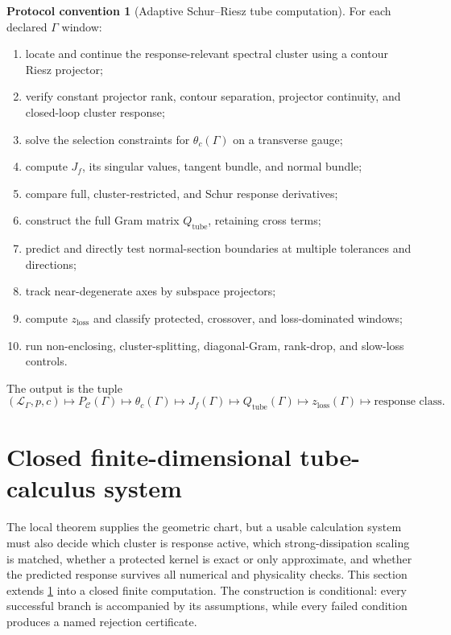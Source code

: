 \documentclass[11pt]{article}
\theoremstyle{definition}
\newtheorem{protocol}[theorem]{Protocol convention}
\theoremstyle{remark}
\newcommand{\cL}{\mathcal L}
\newcommand{\cC}{\mathcal C}
\begin{document}
\begin{protocol}[Adaptive Schur--Riesz tube computation]\label{prot:tube-computation}
For each declared $\Gamma$ window:
\begin{enumerate}
  \item locate and continue the response-relevant spectral cluster using a contour Riesz projector;
  \item verify constant projector rank, contour separation, projector continuity, and closed-loop cluster response;
  \item solve the selection constraints for $\theta_c(\Gamma)$ on a transverse gauge;
  \item compute $J_f$, its singular values, tangent bundle, and normal bundle;
  \item compare full, cluster-restricted, and Schur response derivatives;
  \item construct the full Gram matrix $Q_{\mathrm{tube}}$, retaining cross terms;
  \item predict and directly test normal-section boundaries at multiple tolerances and directions;
  \item track near-degenerate axes by subspace projectors;
  \item compute $z_{\mathrm{loss}}$ and classify protected, crossover, and loss-dominated windows;
  \item run non-enclosing, cluster-splitting, diagonal-Gram, rank-drop, and slow-loss controls.
\end{enumerate}
The output is the tuple
\begin{equation}
\boxed{
(\cL_\Gamma,p,c)
\longmapsto
P_{\cC}(\Gamma)
\longmapsto
\theta_c(\Gamma)
\longmapsto
J_f(\Gamma)
\longmapsto
Q_{\mathrm{tube}}(\Gamma)
\longmapsto
z_{\mathrm{loss}}(\Gamma)
\longmapsto
\text{response class}.
}
\label{eq:tube-computation-chain}
\end{equation}
\end{protocol}

\section{Closed finite-dimensional tube-calculus system}\label{sec:closed-calculus}

The local theorem supplies the geometric chart, but a usable calculation system must also decide which cluster is response active, which strong-dissipation scaling is matched, whether a protected kernel is exact or only approximate, and whether the predicted response survives all numerical and physicality checks.  This section extends \cref{prot:tube-computation} into a closed finite computation.  The construction is conditional: every successful branch is accompanied by its assumptions, while every failed condition produces a named rejection certificate.
\end{document}

